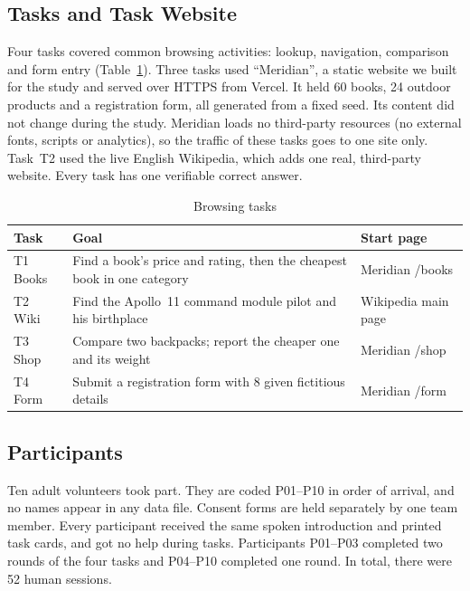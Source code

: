 \subsection{Tasks and Task Website}
\label{sec:method-tasks}
Four tasks covered common browsing activities: lookup, navigation, comparison and form entry (Table~\ref{tab:tasks}). Three tasks used ``Meridian'', a static website we built for the study and served over HTTPS from Vercel. It held 60 books, 24 outdoor products and a registration form, all generated from a fixed seed. Its content did not change during the study. Meridian loads no third-party resources (no external fonts, scripts or analytics), so the traffic of these tasks goes to one site only. Task~T2 used the live English Wikipedia, which adds one real, third-party website. Every task has one verifiable correct answer.

\begin{table}[t]
\centering
\caption{Browsing tasks}
\label{tab:tasks}
\footnotesize
\begin{tabular}{@{}l p{3.6cm} l@{}}
\toprule
Task & Goal & Start page \\
\midrule
T1 Books & Find a book's price and rating, then the cheapest book in one category & Meridian /books \\
T2 Wiki & Find the Apollo~11 command module pilot and his birthplace & Wikipedia main page \\
T3 Shop & Compare two backpacks; report the cheaper one and its weight & Meridian /shop \\
T4 Form & Submit a registration form with 8 given fictitious details & Meridian /form \\
\bottomrule
\end{tabular}
\end{table}

\subsection{Participants}
\label{sec:method-participants}
Ten adult volunteers took part. They are coded P01--P10 in order of arrival, and no names appear in any data file. Consent forms are held separately by one team member. Every participant received the same spoken introduction and printed task cards, and got no help during tasks. Participants P01--P03 completed two rounds of the four tasks and P04--P10 completed one round. In total, there were 52 human sessions.

